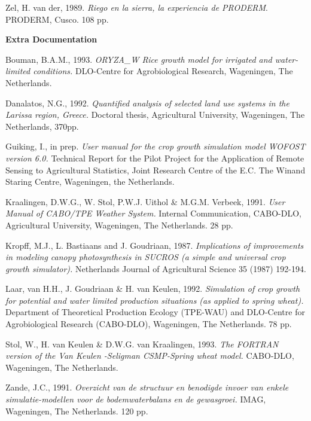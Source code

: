 Zel, H. van der, 1989. {\it Riego en la sierra, la experiencia de PRODERM\/}. PRODERM, Cusco. 108
pp.

\newpage
{\bf Extra Documentation}

Bouman, B.A.M., 1993. {\it ORYZA\_W Rice growth model for irrigated and water-limited conditions.\/}
DLO-Centre for Agrobiological Research, Wageningen, The Netherlands.

Danalatos, N.G., 1992. {\it Quantified analysis of selected land use systems in the Larissa region,
Greece.\/} Doctoral thesis, Agricultural University, Wageningen, The Netherlands, 370pp.

Guiking, I., in prep. {\it User manual for the crop growth simulation model WOFOST version 6.0.\/}
Technical Report for the Pilot Project for the Application of Remote Sensing to Agricultural
Statistics, Joint Research Centre of the E.C. The Winand Staring Centre, Wageningen, the
Netherlands.

Kraalingen, D.W.G., W. Stol, P.W.J. Uithol \& M.G.M. Verbeek, 1991. {\it User Manual of
CABO/TPE Weather System.\/} Internal Communication, CABO-DLO, Agricultural University,
Wageningen, The Netherlands. 28 pp.

Kropff, M.J., L. Bastiaans and J. Goudriaan, 1987. {\it Implications of improvements in modeling canopy
photosynthesis in SUCROS (a simple and universal crop growth simulator).\/} Netherlands Journal of
Agricultural Science 35 (1987) 192-194.

Laar, van H.H., J. Goudriaan \& H. van Keulen, 1992. {\it Simulation of crop growth for potential and
water limited production situations (as applied to spring wheat).\/} Department of Theoretical
Production Ecology (TPE-WAU) and DLO-Centre for Agrobiological Research (CABO-DLO),
Wageningen, The Netherlands. 78 pp.

Stol, W., H. van Keulen \& D.W.G. van Kraalingen, 1993. {\it The FORTRAN version of the Van Keulen
-Seligman CSMP-Spring wheat model.\/} CABO-DLO, Wageningen, The Netherlands.

Zande, J.C., 1991. {\it Overzicht van de structuur en benodigde invoer van enkele simulatie-modellen
voor de bodemwaterbalans en de gewasgroei.\/} IMAG, Wageningen, The Netherlands. 120 pp.

